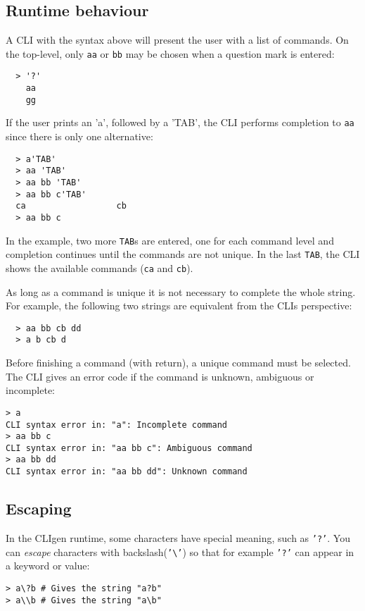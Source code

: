 \documentclass[a4paper, 10pt] {article}
\begin{document}
\subsection{Runtime behaviour}

A CLI with the syntax above will present the user with a list of
commands. On the top-level, only {\tt aa} or {\tt bb} may be chosen when a question mark is entered:
\begin{verbatim}
  > '?'
    aa
    gg
\end{verbatim}

If the user prints an 'a', followed by a 'TAB', the CLI performs
completion to {\tt aa} since there is only one alternative:
\begin{verbatim}
  > a'TAB'
  > aa 'TAB'
  > aa bb 'TAB'
  > aa bb c'TAB'
  ca                  cb
  > aa bb c
\end{verbatim}
In the example, two more {\tt TAB}s are entered, one for each command
level and completion continues until the commands are not unique. In
the last {\tt TAB}, the CLI shows the available commands ({\tt ca} and {\tt cb}).

As long as a command is unique it is not necessary to
complete the whole string. For example, the following two strings are
equivalent from the CLIs perspective:
\begin{verbatim}
  > aa bb cb dd
  > a b cb d
\end{verbatim}

Before finishing a command (with return), a unique
command must be selected. The CLI gives an error code if the command
is unknown, ambiguous or incomplete:
\begin{verbatim}
> a
CLI syntax error in: "a": Incomplete command
> aa bb c
CLI syntax error in: "aa bb c": Ambiguous command
> aa bb dd
CLI syntax error in: "aa bb dd": Unknown command
\end{verbatim}

\subsection{Escaping}

In the CLIgen runtime, some characters have special meaning, such as
{\tt '?'}. You can \emph{escape} characters with backslash({\tt '\textbackslash'}) so
that for example {\tt '?'} can appear in a keyword or value:
\begin{verbatim}
> a\?b # Gives the string "a?b"
> a\\b # Gives the string "a\b"
\end{verbatim}
\end{document}
